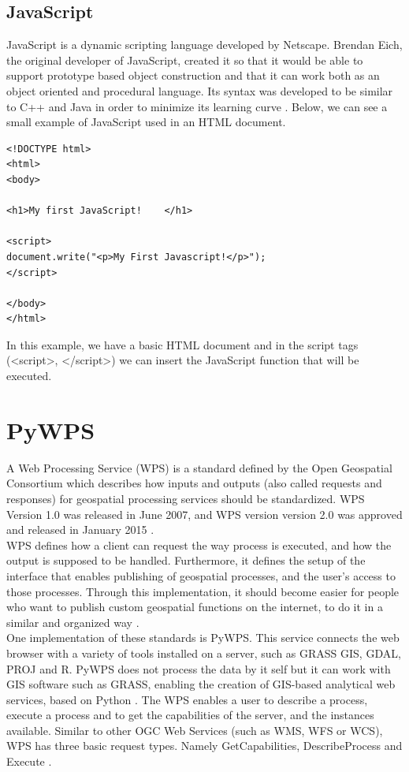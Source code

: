 \subsection{JavaScript}
JavaScript is a dynamic scripting language developed by Netscape. Brendan Eich, the original developer of JavaScript, created it so that it would be able to support prototype based object construction and  that it can work both as an object oriented and procedural language. Its syntax was developed to be similar to C++ and Java in order to minimize its learning curve \citep{mozjava}. Below, we can see a small example of JavaScript used in an HTML document.	

\begin{lstlisting}
<!DOCTYPE html>
<html>
<body>

<h1>My first JavaScript!	</h1>

<script>
document.write("<p>My First Javascript!</p>");
</script>

</body>
</html>
\end{lstlisting}

In this example, we have a basic HTML document and in the script tags (<script>, </script>) we can insert the JavaScript function that will be executed.

\section{PyWPS}

A Web Processing Service (WPS) is a standard defined by the Open Geospatial Consortium which describes how inputs and outputs (also called requests and responses) for geospatial processing services should be standardized. 
WPS Version 1.0 was released in June 2007, and WPS version version 2.0 was approved and released in January 2015 \citep{ogcwps}. \\
WPS defines how a client can request the way process is executed, and how the output is supposed to be handled. Furthermore, it defines the setup of the interface that enables publishing of geospatial processes, and the user's access to those processes. Through this implementation, it should become easier for people who want to publish custom geospatial functions on the internet, to do it in a similar and organized way \citep{ogcwps}. \\

One implementation of these standards is PyWPS. This service connects the web browser with a variety of tools installed on a server, such as GRASS GIS, GDAL, PROJ and R. PyWPS does not process the data by it self but  it can work with GIS software such as GRASS, enabling the creation of GIS-based analytical web services, based on Python \citep{pywpsweb}. 
The WPS enables a user to describe a process, execute a process and to get the capabilities of the server, and the instances available. Similar to other OGC Web Services (such as WMS, WFS or WCS), WPS has three basic request types. Namely GetCapabilities, DescribeProcess and Execute \citep{pywps}.\\

